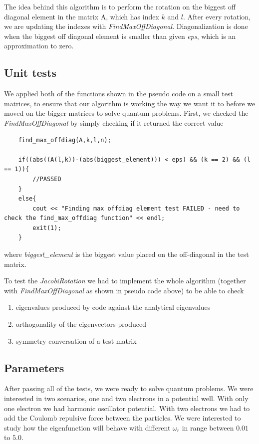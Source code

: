 \documentclass[a4paper, 10pt]{article}
\begin{document}
The idea behind this algorithm is to perform the rotation on the biggest off
diagonal element in the matrix A, which has index \(k\) and \(l\). After every
rotation, we are updating the indexes with \textit{FindMaxOffDiagonal}.
Diagonalization is done when the biggest off diagonal element is smaller than
given \textit{eps}, which is an approximation to  zero.

\subsection{Unit tests}
We applied both of the functions shown in the pseudo code on a
small test matrices, to ensure that our algorithm is working the way we want it
to before we moved on the bigger matrices to solve quantum problems.
First, we checked the \textit{FindMaxOffDiagonal} by simply checking if it
returned the correct value
\begin{lstlisting}
	find_max_offdiag(A,k,l,n);

    if((abs((A(l,k))-(abs(biggest_element))) < eps) && (k == 2) && (l == 1)){
        //PASSED
    }
    else{
        cout << "Finding max offdiag element test FAILED - need to check the find_max_offdiag function" << endl;
        exit(1);
    }
\end{lstlisting}

where \textit{biggest\_element} is the biggest value placed on the off-diagonal
in the test matrix.

To test the \textit{JacobiRotation} we had to implement the whole algorithm
(together with \textit{FindMaxOffDiagonal} as shown in pseudo code above) to be able to check

\begin{enumerate}
\item eigenvalues produced by code against the analytical eigenvalues
\item orthogonality of the eigenvectors produced
\item symmetry conversation of a test matrix
\end{enumerate}

\subsection{Parameters}
After passing all of the tests, we were ready to solve quantum problems. We
were interested in two scenarios, one and  two electrons in a potential well.
With only one electron we had harmonic oscillator potential. With two electrons
we had to add the Coulomb repulsive force between the particles. We were
interested to study how the eigenfunction will behave with different
\(\omega_{r}\) in range between \(0.01\) to \(5.0\).
\end{document}

